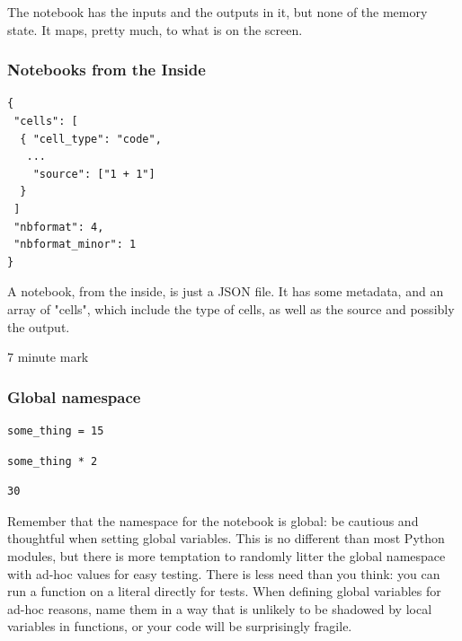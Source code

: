 The notebook has the inputs and the outputs in it,
but none of the memory state.
It maps,
pretty much,
to what is on the screen.


\begin{frame}[fragile]
\frametitle{Notebooks from the Inside}

\begin{lstlisting}
{
 "cells": [
  { "cell_type": "code",
   ...
    "source": ["1 + 1"]
  }
 ]
 "nbformat": 4,
 "nbformat_minor": 1
}
\end{lstlisting}

\end{frame}

A notebook,
from the inside,
is just a JSON file.
It has some metadata,
and an array of "cells",
which include the type of cells,
as well as the source
and possibly the output.

7 minute mark

\begin{frame}[fragile]
\frametitle{Global namespace}

\begin{lstlisting}[frame=single]
some_thing = 15
\end{lstlisting}

\begin{lstlisting}[frame=single]
some_thing * 2
\end{lstlisting}

\begin{lstlisting}[frame=single]
30
\end{lstlisting}

\end{frame}

Remember that the namespace for the notebook is global:
be cautious and thoughtful when setting global variables.
This is no different than most Python modules,
but there is more temptation to randomly litter the global
namespace with ad-hoc values for easy testing.
There is less need than you think:
you can run a function on a literal directly for tests.
When defining global variables for ad-hoc reasons,
name them in a way that is unlikely to be shadowed
by local variables in functions,
or your code will be surprisingly fragile.

